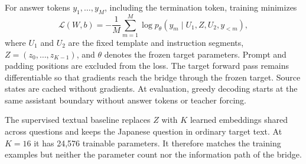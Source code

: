 For answer tokens $y_1,\ldots,y_M$, including the termination token, training minimizes
\begin{equation}
 \mathcal{L}(W,b)
 =-\frac{1}{M}\sum_{m=1}^{M}
 \log p_{\theta}\!\left(y_m\mid U_1,Z,U_2,y_{<m}\right),
 \label{eq:loss}
\end{equation}
where $U_1$ and $U_2$ are the fixed template and instruction segments, $Z=(z_0,\ldots,z_{K-1})$, and $\theta$ denotes the frozen target parameters.
Prompt and padding positions are excluded from the loss.
The target forward pass remains differentiable so that gradients reach the bridge through the frozen target.
Source states are cached without gradients.
At evaluation, greedy decoding starts at the same assistant boundary without answer tokens or teacher forcing.

The supervised textual baseline replaces $Z$ with $K$ learned embeddings shared across questions and keeps the Japanese question in ordinary target text.
At $K=16$ it has 24,576 trainable parameters.
It therefore matches the training examples but neither the parameter count nor the information path of the bridge.
